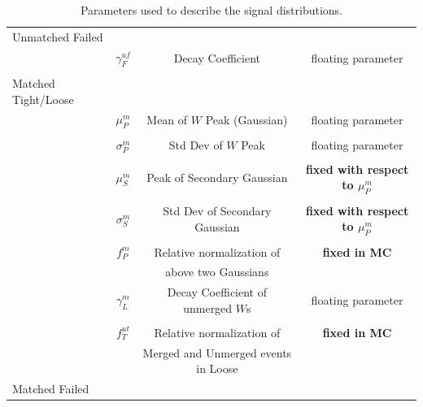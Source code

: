 \begin{}[h!]
\begin{table}
\begin{tabular}{l | c  c  c}
\hline
Unmatched Failed & & & \\
& $\gamma^{uf}_F$ & Decay Coefficient & floating parameter\\
\\
\hline
Matched Tight/Loose & & & \\\
& $\mu^{m}_P$ & Mean of $W$ Peak (Gaussian) & floating parameter\\
\\
& $\sigma^{m}_P$ & Std Dev of $W$ Peak & floating parameter\\
\\
& $\mu^{m}_S$ & Peak of Secondary Gaussian & \textbf{fixed with respect to $\mu^{m}_P$}\\
\\
& $\sigma^{m}_S$ & Std Dev of Secondary Gaussian & \textbf{fixed with respect to $\mu^{m}_P$}\\
\\
& $f^{m}_P$ & Relative normalization of & \textbf{fixed in MC}\\
& &  above two Gaussians &\\
& $\gamma^{m}_L$ & Decay Coefficient of unmerged $W$s & floating parameter\\
\\
& $f^{ut}_T$ & Relative normalization of & \textbf{fixed in MC}\\
& &  Merged and Unmerged events in Loose &\\
\hline
Matched Failed & & & \\
\hline
\end{tabular}
\caption{Parameters used to describe the signal distributions.} \label{tab:sigval}
\end{table}

\end{}
